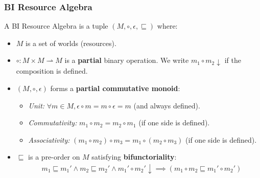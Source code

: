 \newcommand{\compable}[2]{#1 \circ #2 \downarrow}
\begin{frame}[fragile]
    \frametitle{BI Resource Algebra}

\begin{definition}
A BI Resource Algebra is a tuple $(M, \circ, \epsilon, \sqsubseteq)$ where:
\begin{itemize}
    \item $M$ is a set of worlds (resources).
    \item $\circ: M \times M \rightharpoonup M$ is a \textbf{partial} binary operation. 
          We write $\compable{m_1}{m_2}$ if the composition is defined.
    \item $(M, \circ, \epsilon)$ forms a \textbf{partial commutative monoid}:
    \begin{itemize}
        \item \textit{Unit:} $\forall m \in M, \epsilon \circ m = m \circ \epsilon = m$ (and always defined).
        \item \textit{Commutativity:} $m_1 \circ m_2 = m_2 \circ m_1$ (if one side is defined).
        \item \textit{Associativity:} $(m_1 \circ m_2) \circ m_3 = m_1 \circ (m_2 \circ m_3)$ (if one side is defined).
    \end{itemize}
    \item $\sqsubseteq$ is a pre-order on $M$ satisfying \textbf{bifunctoriality}:
    \begin{align*}
    &m_1 \sqsubseteq m_1' \land m_2 \sqsubseteq m_2' \land \compable{m_1'}{m_2'} \implies 
        (m_1 \circ m_2 \sqsubseteq m_1' \circ m_2')
    \end{align*}
\end{itemize}
\end{definition}

\end{frame}

